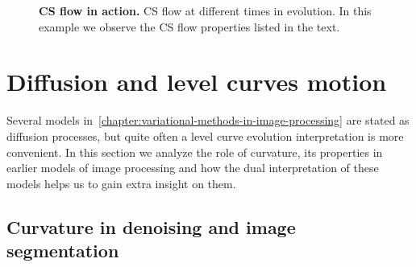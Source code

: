 \begin{figure}
\caption{\textbf{CS flow in action.} CS flow at different times in evolution. In this example we observe the CS flow properties listed in the text.}
\end{figure}



\section{Diffusion and level curves motion}
\label{ch3:sec:diffusion-level-curves-motion}

Several models in~\cref{chapter:variational-methods-in-image-processing} are stated as diffusion processes, but quite often a level curve evolution interpretation is more convenient. In this section we analyze the role of curvature, its properties in earlier models of image processing and how the dual interpretation of these models helps us to gain extra insight on them.

\subsection{Curvature in denoising and image segmentation}


